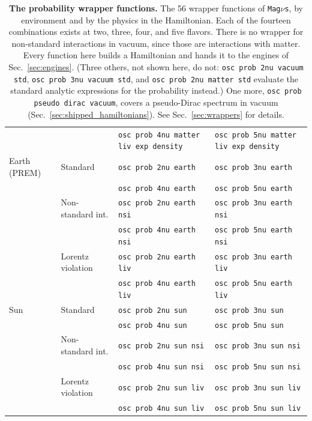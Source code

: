 \documentclass[final,5p,times,twocolumn,sort,compress]{elsarticle}
\makeatletter
\DeclareRobustCommand{\_}{%
  \ifmmode\nfss@text{\textunderscore}\else\textunderscore\allowbreak\fi}
\newcommand{\magnus}{{\tt Mag}\ensuremath{\nu}{\tt s}}
\makeatother
\begin{document}
{\begin{table}[t!]
{\begin{tabular}{@{}p{2.7cm}p{2.5cm}p{5.9cm}p{5.9cm}@{}}
  &  & {\tt osc\_prob\_4nu\_matter\_liv\_exp\_density} & {\tt osc\_prob\_5nu\_matter\_liv\_exp\_density} \\
 Earth (PREM) & Standard & {\tt osc\_prob\_2nu\_earth} & {\tt osc\_prob\_3nu\_earth} \\
  &  & {\tt osc\_prob\_4nu\_earth} & {\tt osc\_prob\_5nu\_earth} \\
  & Non-standard int. & {\tt osc\_prob\_2nu\_earth\_nsi} & {\tt osc\_prob\_3nu\_earth\_nsi} \\
  &  & {\tt osc\_prob\_4nu\_earth\_nsi} & {\tt osc\_prob\_5nu\_earth\_nsi} \\
  & Lorentz violation & {\tt osc\_prob\_2nu\_earth\_liv} & {\tt osc\_prob\_3nu\_earth\_liv} \\
  &  & {\tt osc\_prob\_4nu\_earth\_liv} & {\tt osc\_prob\_5nu\_earth\_liv} \\
 Sun & Standard & {\tt osc\_prob\_2nu\_sun} & {\tt osc\_prob\_3nu\_sun} \\
  &  & {\tt osc\_prob\_4nu\_sun} & {\tt osc\_prob\_5nu\_sun} \\
  & Non-standard int. & {\tt osc\_prob\_2nu\_sun\_nsi} & {\tt osc\_prob\_3nu\_sun\_nsi} \\
  &  & {\tt osc\_prob\_4nu\_sun\_nsi} & {\tt osc\_prob\_5nu\_sun\_nsi} \\
  & Lorentz violation & {\tt osc\_prob\_2nu\_sun\_liv} & {\tt osc\_prob\_3nu\_sun\_liv} \\
  &  & {\tt osc\_prob\_4nu\_sun\_liv} & {\tt osc\_prob\_5nu\_sun\_liv} \\
\end{tabular}}
\caption{\label{tab:wrappers}\textbf{The probability wrapper functions.} The 56 wrapper functions of \magnus, by environment and by the physics in the Hamiltonian. Each of the fourteen combinations exists at two, three, four, and five flavors. There is no wrapper for non-standard interactions in vacuum, since those are interactions with matter. Every function here builds a Hamiltonian and hands it to the engines of Sec.~\ref{sec:engines}. (Three others, not shown here, do not: {\tt osc\_prob\_2nu\_vacuum\_std}, {\tt osc\_prob\_3nu\_vacuum\_std}, and {\tt osc\_prob\_2nu\_matter\_std} evaluate the standard analytic expressions for the probability instead.) One more, {\tt osc\_prob\_pseudo\_dirac\_vacuum}, covers a pseudo-Dirac spectrum in vacuum (Sec.~\ref{sec:shipped_hamiltonians}). See Sec.~\ref{sec:wrappers} for details.}
\end{table}}
\end{document}
